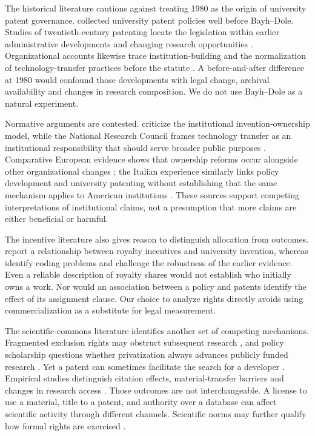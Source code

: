 \documentclass[12pt]{article}
\begin{document}
The historical literature cautions against treating 1980 as the origin of university patent governance. \citet{palmer1962} collected university patent policies well before Bayh--Dole. Studies of twentieth-century patenting locate the legislation within earlier administrative developments and changing research opportunities \citep{mowery2001,sampat2006}. Organizational accounts likewise trace institution-building and the normalization of technology-transfer practices before the statute \citep{berman2008,colyvas2007}. A before-and-after difference at 1980 would confound those developments with legal change, archival availability and changes in research composition. We do not use Bayh--Dole as a natural experiment.

Normative arguments are contested. \citet{kenney2009} criticize the institutional invention-ownership model, while the National Research Council frames technology transfer as an institutional responsibility that should serve broader public purposes \citep{nrc2011}. Comparative European evidence shows that ownership reforms occur alongside other organizational changes \citep{geuna2011}; the Italian experience similarly links policy development and university patenting without establishing that the same mechanism applies to American institutions \citep{baldini2006}. These sources support competing interpretations of institutional claims, not a presumption that more claims are either beneficial or harmful.

The incentive literature also gives reason to distinguish allocation from outcomes. \citet{lach2008} report a relationship between royalty incentives and university invention, whereas \citet{ouellette2020} identify coding problems and challenge the robustness of the earlier evidence. Even a reliable description of royalty shares would not establish who initially owns a work. Nor would an association between a policy and patents identify the effect of its assignment clause. Our choice to analyze rights directly avoids using commercialization as a substitute for legal measurement.

The scientific-commons literature identifies another set of competing mechanisms. Fragmented exclusion rights may obstruct subsequent research \citep{heller1998}, and policy scholarship questions whether privatization always advances publicly funded research \citep{eisenberg1996,rai2003,nelson2004}. Yet a patent can sometimes facilitate the search for a developer \citep{hellmann2007}. Empirical studies distinguish citation effects, material-transfer barriers and changes in research access \citep{murray2007,walsh2005,murray2016}. Those outcomes are not interchangeable. A license to use a material, title to a patent, and authority over a database can affect scientific activity through different channels. Scientific norms may further qualify how formal rights are exercised \citep{rai1999}.
\end{document}
